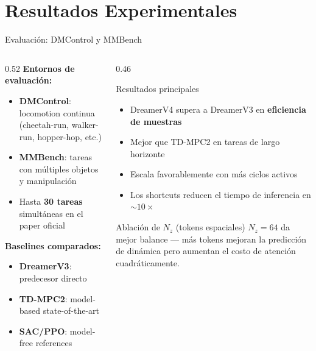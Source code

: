 \documentclass[aspectratio=169, 12pt]{beamer}
\begin{document}
\section{Resultados Experimentales}

\begin{frame}{Evaluación: DMControl y MMBench}
\begin{columns}[T]
  \begin{column}{0.52\textwidth}
    \textbf{Entornos de evaluación:}
    \begin{itemize}
      \item \textbf{DMControl}: locomotion continua (cheetah-run, walker-run, hopper-hop, etc.)
      \item \textbf{MMBench}: tareas con múltiples objetos y manipulación
      \item Hasta \textbf{30 tareas} simultáneas en el paper oficial
    \end{itemize}

    \vspace{8pt}
    \textbf{Baselines comparados:}
    \begin{itemize}
      \item \textbf{DreamerV3}: predecesor directo
      \item \textbf{TD-MPC2}: model-based state-of-the-art
      \item \textbf{SAC/PPO}: model-free references
    \end{itemize}
  \end{column}
  \begin{column}{0.46\textwidth}
    \begin{alertblock}{Resultados principales}
      \begin{itemize}
        \item DreamerV4 supera a DreamerV3 en \textbf{eficiencia de muestras}
        \item Mejor que TD-MPC2 en tareas de largo horizonte
        \item Escala favorablemente con más ciclos activos
        \item Los shortcuts reducen el tiempo de inferencia en ${\sim}10\times$
      \end{itemize}
    \end{alertblock}

    \vspace{6pt}
    \begin{exampleblock}{Ablación de $N_z$ (tokens espaciales)}
      \small $N_z{=}64$ da mejor balance — más tokens mejoran la predicción de dinámica pero aumentan el costo de atención cuadráticamente.
    \end{exampleblock}
  \end{column}
\end{columns}
\end{frame}
\end{document}
